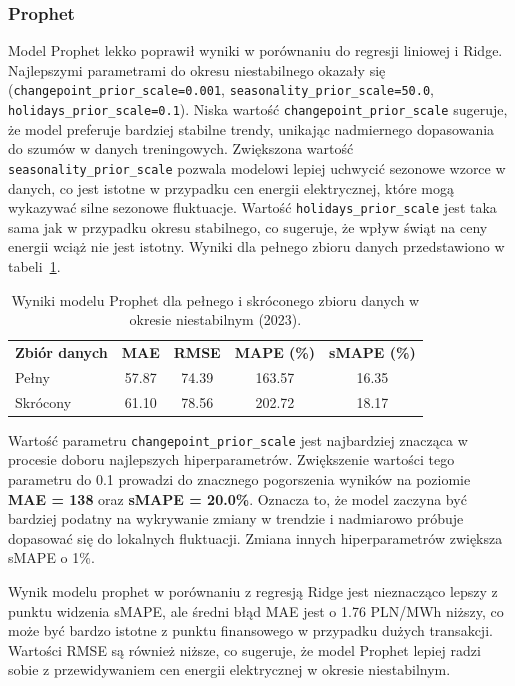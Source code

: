 \subsubsection{Prophet}

Model Prophet lekko poprawił wyniki w porównaniu do regresji liniowej i Ridge. Najlepszymi parametrami do okresu niestabilnego okazały się (\texttt{changepoint\_prior\_scale=0.001}, \texttt{seasonality\_prior\_scale=50.0}, \texttt{holidays\_prior\_scale=0.1}). Niska wartość {\texttt{changepoint\_prior\_scale}} sugeruje, że model preferuje bardziej stabilne trendy, unikając nadmiernego dopasowania do szumów w danych treningowych. Zwiększona wartość {\texttt{seasonality\_prior\_scale}} pozwala modelowi lepiej uchwycić sezonowe wzorce w danych, co jest istotne w przypadku cen energii elektrycznej, które mogą wykazywać silne sezonowe fluktuacje. Wartość {\texttt{holidays\_prior\_scale}} jest taka sama jak w przypadku okresu stabilnego, co sugeruje, że wpływ świąt na ceny energii wciąż nie jest istotny. Wyniki dla pełnego zbioru danych przedstawiono w tabeli~\ref{tab:prophet_results_combined_nonstable}.

\begin{table}[H]
    \centering
    \caption{Wyniki modelu Prophet dla pełnego i skróconego zbioru danych w okresie niestabilnym (2023).}
    \label{tab:prophet_results_combined_nonstable}
    \begin{tabular}{|l|cccc|}
        \hline
        \textbf{Zbiór danych} & \textbf{MAE} & \textbf{RMSE} & \textbf{MAPE (\%)} & \textbf{sMAPE (\%)} \\
        Pełny     & 57.87 & 74.39 & 163.57 & 16.35 \\
        Skrócony  & 61.10 & 78.56 & 202.72 & 18.17 \\
        \hline
    \end{tabular}
\end{table}

Wartość parametru \texttt{changepoint\_prior\_scale} jest najbardziej znacząca w procesie doboru najlepszych hiperparametrów. Zwiększenie wartości tego parametru do 0.1 prowadzi do znacznego pogorszenia wyników na poziomie \textbf{MAE = 138} oraz \textbf{sMAPE = 20.0\%}. Oznacza to, że model zaczyna być bardziej podatny na wykrywanie zmiany w trendzie i nadmiarowo próbuje dopasować się do lokalnych fluktuacji. Zmiana innych hiperparametrów zwiększa sMAPE o 1\%.

Wynik modelu prophet w porównaniu z regresją Ridge jest nieznacząco lepszy z punktu widzenia sMAPE, ale średni błąd MAE jest o 1.76 PLN/MWh niższy, co może być bardzo istotne z punktu finansowego w przypadku dużych transakcji. Wartości RMSE są również niższe, co sugeruje, że model Prophet lepiej radzi sobie z przewidywaniem cen energii elektrycznej w okresie niestabilnym.


